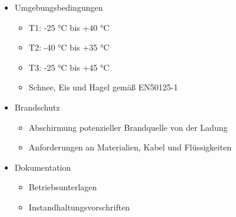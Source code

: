 {\begin{itemize}
\begin{itemize}
	\begin{itemize}
		\item Ausfall einer Einheit bei Mehrfachfehler
		\item Ausfall mehrerer Einheiten bei Einfachfehler
	\end{itemize}
	\item Bremsleistung
	\begin{itemize}
		\item Durch Berechnung gem\"a{\ss} EN14531-6
		\item Durch Versuch gem\"a{\ss} UIC 544-1
	\end{itemize}
	\item Feststellbremse
	\begin{itemize}
		\item Zustandsanzeige
	\end{itemize}
	\item W\"armekapazit\"at
	\begin{itemize}
		\item Dauerbremsung mit 45 kW (70 km/h, 40 km, i = 2,1\%)
	\end{itemize}
	\item Gleitschutz f\"ur Scheibenbremsen oder Klotzbremse mit $\mu_{m} > 0{,}12$
\end{itemize}
\item Umgebungsbedingungen
\begin{itemize}
	\item T1: -25 \si{\degreeCelsius} bis +40 \si{\degreeCelsius}
	\item T2: -40 \si{\degreeCelsius} bis +35 \si{\degreeCelsius}
	\item T3: -25 \si{\degreeCelsius} bis +45 \si{\degreeCelsius}
	\item Schnee, Eis und Hagel gem\"a{\ss} EN50125-1
\end{itemize}
\item Brandschutz
\begin{itemize}
	\item Abschirmung potenzieller Brandquelle von der Ladung
	\item Anforderungen an Materialien, Kabel und Fl\"ussigkeiten
\end{itemize}
\item Dokumentation
\begin{itemize}
	\item Betriebsunterlagen
	\item Instandhaltungsvorschriften
\end{itemize}
\end{itemize}
}

